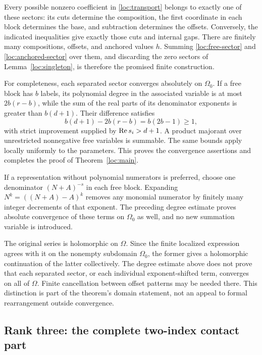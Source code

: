 Every possible nonzero coefficient in \eqref{loc:transport} belongs to
exactly one of these sectors: its cuts determine the composition, the
first coordinate in each block determines the base, and subtraction
determines the offsets.  Conversely, the indicated inequalities give
exactly those cuts and internal gaps.  There are finitely many
compositions, offsets, and anchored values $h$.  Summing
\eqref{loc:free-sector} and \eqref{loc:anchored-sector} over them, and
discarding the zero sectors of Lemma~\ref{loc:singleton}, is therefore
the promised finite construction.

For completeness, each separated sector converges absolutely on
$\Omega_0$.  If a free block has $b$ labels, its polynomial degree in
the associated variable is at most $2b(r-b)$, while the sum of the real
parts of its denominator exponents is greater than $b(d+1)$.  Their
difference satisfies
\[
 b(d+1)-2b(r-b)=b(2b-1)\ge1,
\]
with strict improvement supplied by $\operatorname{Re} s_i>d+1$.  A product
majorant over unrestricted nonnegative free variables is summable.
The same bounds apply locally uniformly to the parameters.  This proves
the convergence assertions and completes the proof of
Theorem~\ref{loc:main}.

If a representation without polynomial numerators is preferred, choose
one denominator $(N+A)^{-s}$ in each free block.  Expanding
$N^k=((N+A)-A)^k$ removes any monomial numerator by finitely many integer
decrements of that exponent.  The preceding degree estimate proves
absolute convergence of these terms on $\Omega_0$ as well, and no new
summation variable is introduced.

\begin{remark}
\label{loc:continuation-caution}
The original series is holomorphic on $\Omega$.  Since the finite
localized expression agrees with it on the nonempty subdomain
$\Omega_0$, the former gives a holomorphic continuation of the latter
collectively.  The degree estimate above does not prove that each
separated sector, or each individual exponent-shifted term, converges
on all of $\Omega$.  Finite cancellation between offset patterns may be
needed there.  This distinction is part of the theorem's domain
statement, not an appeal to formal rearrangement outside convergence.
\end{remark}

\subsection{Rank three: the complete two-index contact part}

